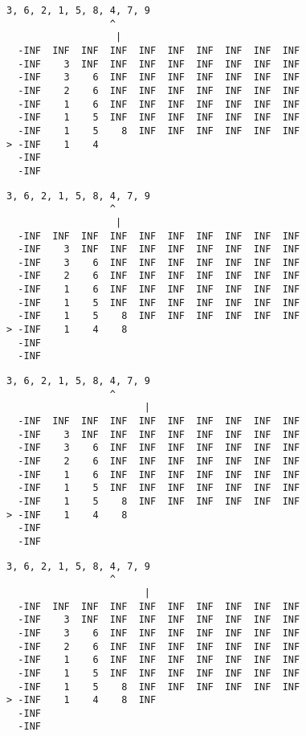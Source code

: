 { \begin{verbatim}
3, 6, 2, 1, 5, 8, 4, 7, 9
                  ^
                   |
  -INF  INF  INF  INF  INF  INF  INF  INF  INF  INF
  -INF    3  INF  INF  INF  INF  INF  INF  INF  INF
  -INF    3    6  INF  INF  INF  INF  INF  INF  INF
  -INF    2    6  INF  INF  INF  INF  INF  INF  INF
  -INF    1    6  INF  INF  INF  INF  INF  INF  INF
  -INF    1    5  INF  INF  INF  INF  INF  INF  INF
  -INF    1    5    8  INF  INF  INF  INF  INF  INF
> -INF    1    4                                   
  -INF                                             
  -INF                                             
\end{verbatim} }

{ \begin{verbatim}
3, 6, 2, 1, 5, 8, 4, 7, 9
                  ^
                   |
  -INF  INF  INF  INF  INF  INF  INF  INF  INF  INF
  -INF    3  INF  INF  INF  INF  INF  INF  INF  INF
  -INF    3    6  INF  INF  INF  INF  INF  INF  INF
  -INF    2    6  INF  INF  INF  INF  INF  INF  INF
  -INF    1    6  INF  INF  INF  INF  INF  INF  INF
  -INF    1    5  INF  INF  INF  INF  INF  INF  INF
  -INF    1    5    8  INF  INF  INF  INF  INF  INF
> -INF    1    4    8                              
  -INF                                             
  -INF                                             
\end{verbatim} }

{ \begin{verbatim}
3, 6, 2, 1, 5, 8, 4, 7, 9
                  ^
                        |
  -INF  INF  INF  INF  INF  INF  INF  INF  INF  INF
  -INF    3  INF  INF  INF  INF  INF  INF  INF  INF
  -INF    3    6  INF  INF  INF  INF  INF  INF  INF
  -INF    2    6  INF  INF  INF  INF  INF  INF  INF
  -INF    1    6  INF  INF  INF  INF  INF  INF  INF
  -INF    1    5  INF  INF  INF  INF  INF  INF  INF
  -INF    1    5    8  INF  INF  INF  INF  INF  INF
> -INF    1    4    8                              
  -INF                                             
  -INF                                             
\end{verbatim} }

{ \begin{verbatim}
3, 6, 2, 1, 5, 8, 4, 7, 9
                  ^
                        |
  -INF  INF  INF  INF  INF  INF  INF  INF  INF  INF
  -INF    3  INF  INF  INF  INF  INF  INF  INF  INF
  -INF    3    6  INF  INF  INF  INF  INF  INF  INF
  -INF    2    6  INF  INF  INF  INF  INF  INF  INF
  -INF    1    6  INF  INF  INF  INF  INF  INF  INF
  -INF    1    5  INF  INF  INF  INF  INF  INF  INF
  -INF    1    5    8  INF  INF  INF  INF  INF  INF
> -INF    1    4    8  INF                         
  -INF                                             
  -INF                                             
\end{verbatim} }


